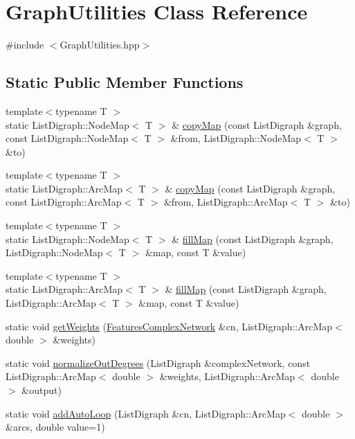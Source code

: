 \hypertarget{class_graph_utilities}{\section{Graph\+Utilities Class Reference}
\label{class_graph_utilities}
}


{\ttfamily \#include $<$Graph\+Utilities.\+hpp$>$}

\subsection*{Static Public Member Functions}
\begin{DoxyCompactItemize}
\item 
{\footnotesize template$<$typename T $>$ }\\static List\+Digraph\+::\+Node\+Map$<$ T $>$ \& \hyperlink{class_graph_utilities_afd29a289301241336d141052471225b0}{copy\+Map} (const List\+Digraph \&graph, const List\+Digraph\+::\+Node\+Map$<$ T $>$ \&from, List\+Digraph\+::\+Node\+Map$<$ T $>$ \&to)
\item 
{\footnotesize template$<$typename T $>$ }\\static List\+Digraph\+::\+Arc\+Map$<$ T $>$ \& \hyperlink{class_graph_utilities_a28df2e4c3b6e6b3dd50f4224aa9e6af4}{copy\+Map} (const List\+Digraph \&graph, const List\+Digraph\+::\+Arc\+Map$<$ T $>$ \&from, List\+Digraph\+::\+Arc\+Map$<$ T $>$ \&to)
\item 
{\footnotesize template$<$typename T $>$ }\\static List\+Digraph\+::\+Node\+Map$<$ T $>$ \& \hyperlink{class_graph_utilities_ae00cf745ed72f71835147a83f3a8111f}{fill\+Map} (const List\+Digraph \&graph, List\+Digraph\+::\+Node\+Map$<$ T $>$ \&map, const T \&value)
\item 
{\footnotesize template$<$typename T $>$ }\\static List\+Digraph\+::\+Arc\+Map$<$ T $>$ \& \hyperlink{class_graph_utilities_afcd9e859008f3023f75a1c1b9972cfd6}{fill\+Map} (const List\+Digraph \&graph, List\+Digraph\+::\+Arc\+Map$<$ T $>$ \&map, const T \&value)
\item 
static void \hyperlink{class_graph_utilities_ad092c90863dca74df15d6ed201c6e985}{get\+Weights} (\hyperlink{class_features_complex_network}{Features\+Complex\+Network} \&cn, List\+Digraph\+::\+Arc\+Map$<$ double $>$ \&weights)
\item 
static void \hyperlink{class_graph_utilities_ae41ba7e07c1c11adf48583de7f72e8a8}{normalize\+Out\+Degrees} (List\+Digraph \&complex\+Network, const List\+Digraph\+::\+Arc\+Map$<$ double $>$ \&weights, List\+Digraph\+::\+Arc\+Map$<$ double $>$ \&output)
\item 
static void \hyperlink{class_graph_utilities_ac336fc79436ed71a0c604bb2a35f8b23}{add\+Auto\+Loop} (List\+Digraph \&cn, List\+Digraph\+::\+Arc\+Map$<$ double $>$ \&arcs, double value=1)
\end{DoxyCompactItemize}
